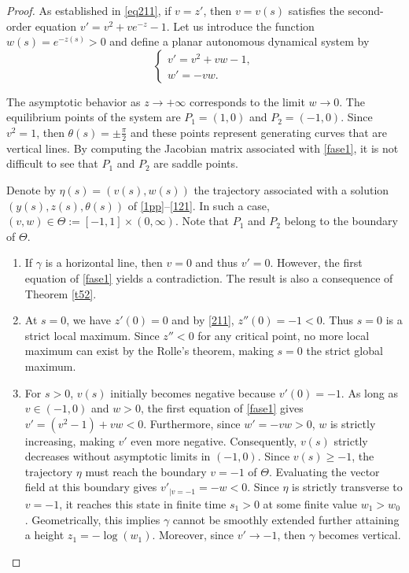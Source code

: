 \documentclass[10pt,a4paper]{amsart}
\begin{document}
\begin{proof} 
As established in \eqref{eq211}, if $v=z'$, then $v=v(s)$ satisfies the second-order equation $v' = v^2 + v e^{-z} - 1$. Let us introduce the function $w(s) = e^{-z(s)} > 0$ and define a planar autonomous dynamical system by 
\begin{equation}\label{fase1}
\begin{cases}
v' = v^2 + vw - 1, \\
w' = -vw.
\end{cases}
\end{equation}
 
 The asymptotic behavior as $z \to +\infty$ corresponds to the limit $w \to 0$. The equilibrium points of the system are $P_1 = (1, 0)$ and $P_2 = (-1, 0)$. Since $v^2=1$, then $\theta(s)=\pm\frac{\pi}{2}$ and these points represent generating curves that are vertical lines. By computing the Jacobian matrix associated with \eqref{fase1}, it is not difficult to see that $P_1$ and $P_2$ are saddle points. 
 


Denote by $\eta(s)=(v(s),w(s))$ the trajectory associated with a solution $(y(s),z(s),\theta(s))$ of \eqref{1pp}--\eqref{121}. In such a case, $(v,w)\in \Theta:=[-1,1]\times (0,\infty)$. Note that $P_1$ and $P_2$ belong to the boundary of $\Theta$.
\begin{enumerate}
\item If $\gamma$ is a horizontal line, then $v = 0$ and thus $v' = 0$. However, the first equation of \eqref{fase1} yields a contradiction. The result is also a consequence of Theorem \ref{t52}.
 \item At $s=0$, we have $z'(0)=0$ and by \eqref{211}, $z''(0)=-1<0$. Thus $s=0$ is a strict local maximum. Since $z''<0$ for any critical point, no more local maximum can exist by the Rolle's theorem, making $s=0$ the strict global maximum.
 
 
\item For $s > 0$, $v(s)$ initially becomes negative because $v'(0)=-1$. As long as $v \in (-1, 0)$ and $w > 0$, the first equation of \eqref{fase1} gives $v' = (v^2 - 1) + vw<0$. Furthermore, since $w' = -vw > 0$, $w$ is strictly increasing, making $v'$ even more negative. Consequently, $v(s)$ strictly decreases without asymptotic limits in $(-1, 0)$. Since $v(s) \ge -1$, the trajectory $\eta$ must reach the boundary $v = -1$ of $\Theta$. Evaluating the vector field at this boundary gives $v'_{|v=-1} = -w < 0$. Since $\eta$ is strictly transverse to $v=-1$, it reaches this state in finite time $s_1 > 0$ at some finite value $w_1 > w_0$. Geometrically, this implies $\gamma$ cannot be smoothly extended further attaining a height $z_1 = -\log(w_1)$. Moreover, since $v'\to -1$, then $\gamma$ becomes vertical.



\end{enumerate}
\end{proof}
\end{document}
